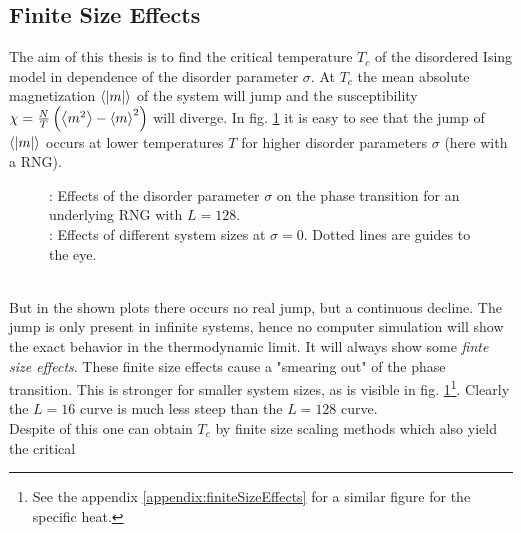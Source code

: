 \subsection{Finite Size Effects}
\label{ssec:finitesize}
    The aim of this thesis is to find the critical temperature \(T_c\)
    of the disordered Ising model in dependence of the disorder parameter
    \(\sigma\). At \(T_c\) the mean absolute magnetization \(\left< |m| \right>\) of
    the system will jump and the susceptibility
    \(\chi = \frac{N}{T}\left(\left< m^2 \right>-\left< m \right>^2\right)\)
    will diverge. In fig. \ref{fig:smeared_out}
    it is easy to see that the jump of \(\left< |m| \right>\)
    occurs at lower temperatures \(T\) for higher
    disorder parameters \(\sigma\) (here with a RNG).
    \begin{figure}[htbp]
        \centering
        \caption[Phase Transition and Finite Size Effects]
        {
            : Effects of the disorder
            parameter $\sigma$ on the phase transition
            for an underlying RNG with $L=128$.\\
            : Effects of different system
            sizes at \(\sigma = 0\). Dotted lines are guides to the eye.
        }
        \label{fig:smeared_out}
    \end{figure}\\
    But in the shown plots there occurs no real jump, but a continuous
    decline. The jump is only present in infinite systems, hence no
    computer simulation will show the exact behavior in the
    thermodynamic limit. It will always show some \emph{finte size effects}.
    These finite size effects cause a "smearing out" of the phase
    transition. This is stronger for smaller system sizes, as is visible
    in fig. \ref{fig:smeared_out}\footnote{See the appendix \ref{appendix:finiteSizeEffects} for a similar figure for the specific heat.}.
    Clearly the \(L=16\) curve is much less steep than the \(L=128\) curve.\\
    Despite of this one can obtain \(T_c\) by finite size scaling
    methods \cite[S. ??]{NewmanBarkema1999} which also yield the critical

